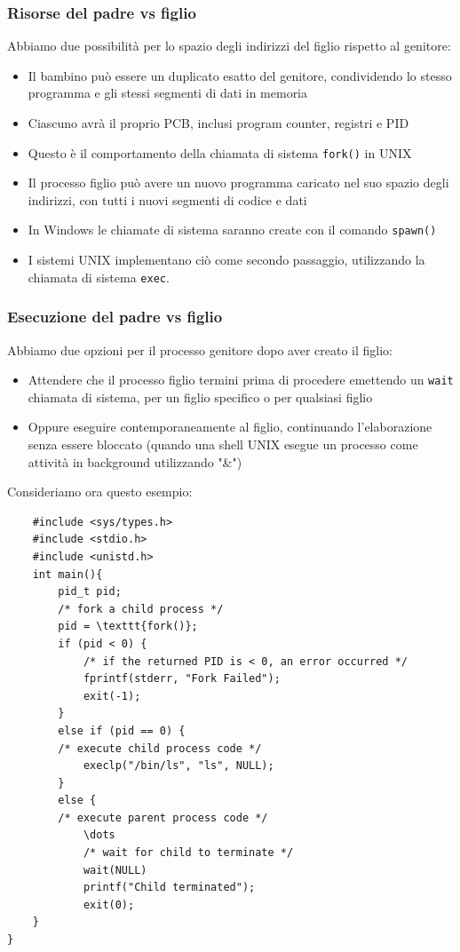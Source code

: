 \documentclass{article}
\begin{document}
\subsubsection{Risorse del padre vs figlio}
Abbiamo due possibilità per lo spazio degli indirizzi del figlio rispetto al genitore:
\begin{itemize}
    \item Il bambino può essere un duplicato esatto del genitore, condividendo lo stesso programma e gli stessi segmenti di dati in memoria
    \item Ciascuno avrà il proprio PCB, inclusi program counter, registri e PID 
    \item Questo è il comportamento della chiamata di sistema \texttt{fork()} in UNIX
    \item Il processo figlio può avere un nuovo programma caricato nel suo spazio degli indirizzi, con tutti i nuovi segmenti di codice e dati
    \item In Windows le chiamate di sistema saranno create con il comando \texttt{spawn()} 
    \item I sistemi UNIX implementano ciò come secondo passaggio, utilizzando la chiamata di sistema \texttt{exec}.
\end{itemize}
\subsubsection{Esecuzione del padre vs figlio}
Abbiamo due opzioni per il processo genitore dopo aver creato il figlio:
\begin{itemize} 
    \item Attendere che il processo figlio termini prima di procedere emettendo un \texttt{wait} chiamata di sistema, per un figlio specifico o per qualsiasi figlio
    \item Oppure eseguire contemporaneamente al figlio, continuando l'elaborazione senza essere bloccato (quando una shell UNIX esegue un processo come attività in background utilizzando "\&")
\end{itemize}

Consideriamo ora questo esempio:
\begin{lstlisting}
    #include <sys/types.h>
    #include <stdio.h>
    #include <unistd.h>
    int main(){
        pid_t pid;
        /* fork a child process */
        pid = \texttt{fork()};
        if (pid < 0) { 
            /* if the returned PID is < 0, an error occurred */
            fprintf(stderr, "Fork Failed");
            exit(-1); 
        }
        else if (pid == 0) {
        /* execute child process code */
            execlp("/bin/ls", "ls", NULL);
        }
        else {
        /* execute parent process code */
            \dots
            /* wait for child to terminate */
            wait(NULL)
            printf("Child terminated");
            exit(0); 
    }
}
\end{lstlisting}
\end{document}
